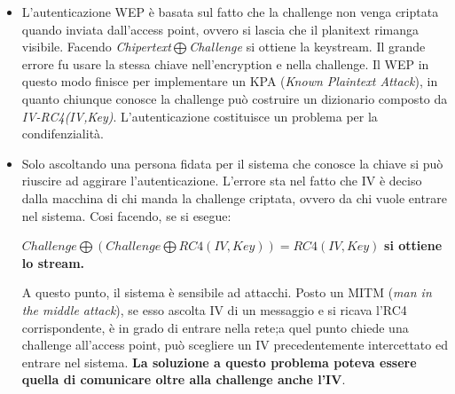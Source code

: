 \documentclass{book}
\theoremstyle{remark}
\begin{document}
\begin{itemize}
	\item L'autenticazione WEP è basata sul fatto che la challenge non venga criptata quando inviata dall'access point, ovvero si lascia che il planitext rimanga visibile\@. Facendo \emph{Chipertext\(\bigoplus \)Challenge} si ottiene la keystream\@. Il grande errore fu usare la stessa chiave nell'encryption e nella challenge\@. Il WEP in questo modo finisce per implementare un KPA (\emph{Known Plaintext Attack}), in quanto chiunque conosce la challenge può costruire un dizionario composto da \emph{IV-RC4(IV,Key)}\@. L'autenticazione costituisce un problema per la condifenzialità\@.
	\item Solo ascoltando una persona fidata per il sistema che conosce la chiave si può riuscire ad aggirare l'autenticazione\@. L'errore sta nel fatto che IV è deciso dalla macchina di chi manda la challenge criptata, ovvero da chi vuole entrare nel sistema\@. Cosi facendo, se si esegue:\begin{center}
		      \(Challenge\bigoplus (Challenge \bigoplus RC4(IV,Key))=RC4(IV,Key)\) \textbf{si ottiene lo stream\@.}
	      \end{center}
	      A questo punto, il sistema è sensibile ad attacchi\@. Posto un MITM (\emph{man in the middle attack}), se esso ascolta IV di un messaggio e si ricava l'RC4 corrispondente, è in grado di entrare nella rete;\@se a quel punto chiede una challenge all'access point, può scegliere un IV precedentemente intercettato ed entrare nel sistema\@.\newline
	      \textbf{La soluzione a questo problema poteva essere quella di comunicare oltre alla challenge anche l'IV}\@.
\end{itemize}
\end{document}
